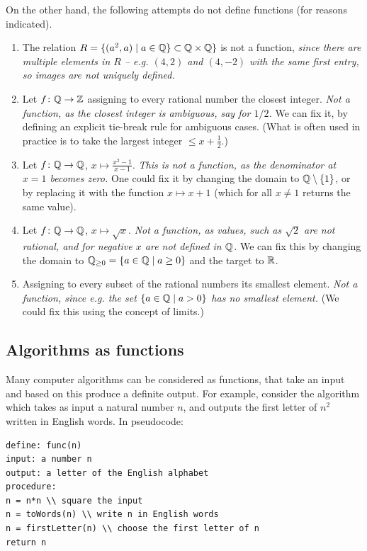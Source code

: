 On the other hand, the following attempts do not define functions (for
reasons indicated).
\begin{enumerate}
\item The relation $R=\{(a^2,a)\mid a\in{\mathbb Q}\}\subset{\mathbb Q}\times{\mathbb Q}\}$ is not a
function, {\em since there are multiple elements in $R$ -- e.g. $(4,2)$ and
$(4,-2)$ with the same first entry, so images are not uniquely defined.}
\item
Let $f\colon{\mathbb Q}\to{\mathbb Z}$ assigning to every rational number the
closest integer. {\em Not a function, as the closest integer is ambiguous,
say for $1/2$.} We can fix it, by defining an explicit tie-break rule for
ambiguous cases. (What is often used in practice is to take the largest integer $\le
x+\frac{1}{2}$.)
\item
Let $f\colon{\mathbb Q}\to{\mathbb Q}$, $x\mapsto\frac{x^2-1}{x-1}$. {\em This is not a function,
as the denominator at $x=1$ becomes zero.} One could fix it by changing the
domain to ${\mathbb Q}\setminus\{1\}$, or by replacing it with the function $x\mapsto
x+1$ (which for all $x\not=1$ returns the same value).
\item
Let $f\colon{\mathbb Q}\to{\mathbb Q}$, $x\mapsto\sqrt{x}$. {\em Not a function, as values,
such as $\sqrt{2}$ are not rational, and for negative $x$ are not defined in ${\mathbb Q}$.}
We can fix this by changing the domain to ${\mathbb Q}_{\ge 0}=\{a\in{\mathbb Q}\mid
a\ge 0\}$ and the target to ${\mathbb R}$.
\item Assigning to every subset of the rational numbers its smallest
element. {\em Not a function, since e.g. the set $\{a\in{\mathbb Q}\mid a>0\}$ has no
smallest element.} (We could fix this using the concept of
limits.)
\end{enumerate}


\subsection{Algorithms as functions}

Many computer algorithms can be considered as functions, that take an input
and based on this produce a definite output.  For example, consider the
algorithm which takes as input a natural number $n$, and outputs the first
letter of $n^2$ written in English words. In pseudocode:

\begin{verbatim}
define: func(n)
input: a number n
output: a letter of the English alphabet
procedure:
n = n*n \\ square the input
n = toWords(n) \\ write n in English words
n = firstLetter(n) \\ choose the first letter of n
return n
\end{verbatim}

